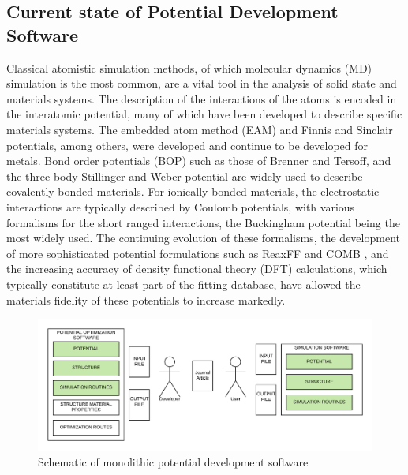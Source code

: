 \subsection{Current state of Potential Development Software}

Classical atomistic simulation methods, of which molecular dynamics (MD) simulation\cite{allen1987_md,haile1992_md,lesar2013_md,frenkel2002_md} is the most common, are a vital tool in the analysis of solid state and materials systems.
The description of the interactions of the atoms is encoded in the interatomic potential, many of which have been developed to describe specific materials systems.
The embedded atom method (EAM)\cite{daw1983_eam,daw1984_eam,daw1993_eam_review,foiles2012_eam_review} and Finnis and Sinclair\cite{finnis1984_fs} potentials, among others, were developed and continue to be developed for metals.
Bond order potentials (BOP) such as those of Brenner\cite{brenner1989_bop,brenner2002_rebo} and Tersoff\cite{tersoff1988_tersoff}, and the three-body Stillinger and Weber\cite{stillinger1985_sw} potential are widely used to describe covalently-bonded materials.
For ionically bonded materials, the electrostatic interactions are typically described by Coulomb potentials, with various formalisms for the short ranged interactions, the Buckingham potential being the most widely used.\cite{lewis1985_buck,gale1996_buck}
The continuing evolution of these formalisms, the development of more sophisticated potential formulations such as ReaxFF\cite{vanduin2001_reaxff,senftle2016_reaxff} and COMB \cite{liang2013_comb_1,liang2013_comb_2}, and the increasing accuracy of density functional theory (DFT) calculations, which typically constitute at least part of the fitting database, have allowed the materials fidelity of these potentials to increase markedly.

\begin{figure}[ht]
	\label{fig:potdev_monolithic}
	\centering
	\includegraphics[width=5in]{chapter6/img/fig_potdev_monolithic}
	\caption{Schematic of monolithic potential development software}
\end{figure}

